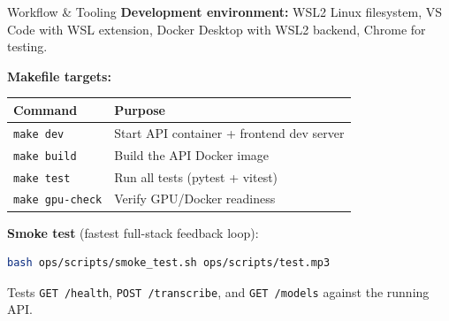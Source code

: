 \documentclass{beamer}
\begin{document}
\begin{frame}[fragile]{Workflow \& Tooling}
    \small
    \textbf{Development environment:}
    WSL2 Linux filesystem, VS Code with WSL extension,
    Docker Desktop with WSL2 backend, Chrome for testing.

    \vspace{0.3em}
    \textbf{Makefile targets:}
    \vspace{0.1em}

    \begin{table}
    \centering
    \small
    \begin{tabular}{ll}
        \toprule
        \textbf{Command} & \textbf{Purpose} \\
        \midrule
        \texttt{make dev}       & Start API container + frontend dev server \\
        \texttt{make build}     & Build the API Docker image \\
        \texttt{make test}      & Run all tests (pytest + vitest) \\
        \texttt{make gpu-check} & Verify GPU/Docker readiness \\
        \bottomrule
    \end{tabular}
    \end{table}

    \vspace{0.3em}
    \textbf{Smoke test} (fastest full-stack feedback loop):
    \begin{lstlisting}[language=bash]
bash ops/scripts/smoke_test.sh ops/scripts/test.mp3
    \end{lstlisting}
    Tests \texttt{GET /health}, \texttt{POST /transcribe}, and
    \texttt{GET /models} against the running API.
\end{frame}
\end{document}
